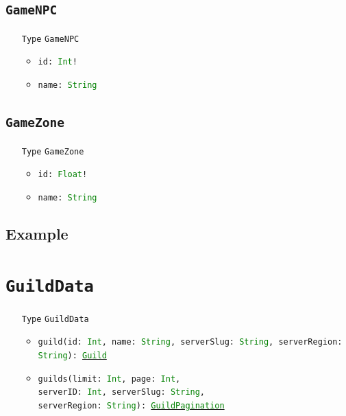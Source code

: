 \documentclass[10pt, a4paper]{memoir}
\numberwithin{equation}{section}
\theoremstyle{plain}
\theoremstyle{defp}
\theoremstyle{dotless}
\theoremstyle{definition}
\theoremstyle{dotless}
\theoremstyle{dotless}
\theoremstyle{defp}
\theoremstyle{defp}
\theoremstyle{be}          %
\theoremstyle{defp}
\newcommand\ttt[1]{\texttt{#1}}
\newcommand\type[1]{\ttt{\textcolor{green}{#1}}}
\begin{document}
\subsection{\ttt{GameNPC}}\label{sec:GameNPC}

\begin{itemize}[noitemsep,topsep=1pt]
\item[\ttt{Type}] \ttt{GameNPC}
\begin{itemize}[itemsep=1pt,topsep=1pt]
\item \ttt{id: \type{Int}!}
\item \ttt{name: \type{String}}
\end{itemize}
\end{itemize}

\subsection{\ttt{GameZone}}\label{sec:GameZone}

\begin{itemize}[noitemsep,topsep=1pt]
\item[\ttt{Type}] \ttt{GameZone}
\begin{itemize}[itemsep=1pt,topsep=1pt]
\item \ttt{id: \type{Float}!}
\item \ttt{name: \type{String}}
\end{itemize}
\end{itemize}

\subsection{Example}

\newpage



\section{\ttt{GuildData}}\label{sec:GuildData}

\begin{itemize}[noitemsep,topsep=1pt]
\item[\ttt{Type}] \ttt{GuildData}
\begin{itemize}[itemsep=1pt,topsep=1pt]
\item \ttt{guild(id: \type{Int}, name: \type{String}, serverSlug: \type{String}, serverRegion: \type{String}): \hyperref[sec:Guild]{\type{Guild}}}
\item \ttt{guilds(limit: \type{Int}, page: \type{Int}, \\serverID: \type{Int}, serverSlug: \type{String}, \\serverRegion: \type{String}): \hyperref[sec:guildpagination]{\type{GuildPagination}}}
\end{itemize}
\end{itemize}
\end{document}
